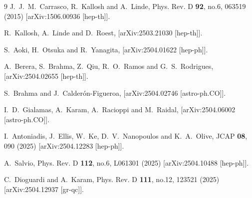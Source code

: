 \documentclass[aps,prev,twocolumn,preprintnumbers,floatfix,nofootinbib]{revtex4-1}
\begin{document}
\begin{thebibliography}{9}
J.~J.~M.~Carrasco, R.~Kallosh and A.~Linde,
Phys. Rev. D \textbf{92}, no.6, 063519 (2015)
[arXiv:1506.00936 [hep-th]].

R.~Kallosh, A.~Linde and D.~Roest,
[arXiv:2503.21030 [hep-th]].



S.~Aoki, H.~Otsuka and R.~Yanagita,
[arXiv:2504.01622 [hep-ph]].

A.~Berera, S.~Brahma, Z.~Qiu, R.~O.~Ramos and G.~S.~Rodrigues,
[arXiv:2504.02655 [hep-th]].

S.~Brahma and J.~Calder\'on-Figueroa,
[arXiv:2504.02746 [astro-ph.CO]].

I.~D.~Gialamas, A.~Karam, A.~Racioppi and M.~Raidal,
[arXiv:2504.06002 [astro-ph.CO]].

I.~Antoniadis, J.~Ellis, W.~Ke, D.~V.~Nanopoulos and K.~A.~Olive,
JCAP \textbf{08}, 090 (2025)
[arXiv:2504.12283 [hep-ph]].

A.~Salvio,
Phys. Rev. D \textbf{112}, no.6, L061301 (2025)
[arXiv:2504.10488 [hep-ph]].


C.~Dioguardi and A.~Karam,
Phys. Rev. D \textbf{111}, no.12, 123521 (2025)
[arXiv:2504.12937 [gr-qc]].


\end{thebibliography}
\end{document}
